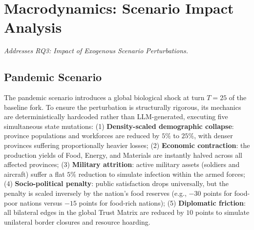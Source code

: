 

\section{Macrodynamics: Scenario Impact Analysis}
\label{sec:res_scenario}
\textit{Addresses RQ3: Impact of Exogenous Scenario Perturbations.}


\subsection{Pandemic Scenario}
\label{sec:res_scenario_pandemic}

The pandemic scenario introduces a global biological shock at turn $T=25$ of the baseline fork. To ensure the perturbation is structurally rigorous, its mechanics are deterministically hardcoded rather than LLM-generated, executing five simultaneous state mutations: (1) \textbf{Density-scaled demographic collapse}: province populations and workforces are reduced by $5\%$ to $25\%$, with denser provinces suffering proportionally heavier losses; (2) \textbf{Economic contraction}: the production yields of Food, Energy, and Materials are instantly halved across all affected provinces; (3) \textbf{Military attrition}: active military assets (soldiers and aircraft) suffer a flat $5\%$ reduction to simulate infection within the armed forces; (4) \textbf{Socio-political penalty}: public satisfaction drops universally, but the penalty is scaled inversely by the nation's food reserves (e.g., $-30$ points for food-poor nations versus $-15$ points for food-rich nations); (5) \textbf{Diplomatic friction}: all bilateral edges in the global Trust Matrix are reduced by $10$ points to simulate unilateral border closures and resource hoarding.

